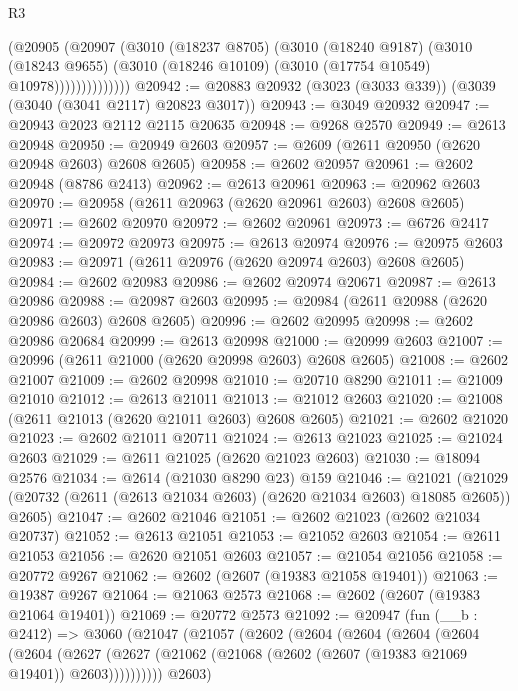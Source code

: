 \begin{lexlean}{R3}
\begin{coremodule}
                  (@20905
                    (@20907
                      (@3010
                        (@18237 @8705)
                        (@3010
                          (@18240 @9187)
                          (@3010
                            (@18243 @9655)
                            (@3010 (@18246 @10109) (@3010 (@17754 @10549) @10978))))))))))))))
@20942 := @20883 @20932 (@3023 (@3033 @339)) (@3039 (@3040 (@3041 @2117) @20823 @3017))
@20943 := @3049 @20932
@20947 := @20943 @2023 @2112 @2115 @20635
@20948 := @9268 @2570
@20949 := @2613 @20948
@20950 := @20949 @2603
@20957 := @2609 (@2611 @20950 (@2620 @20948 @2603) @2608 @2605)
@20958 := @2602 @20957
@20961 := @2602 @20948 (@8786 @2413)
@20962 := @2613 @20961
@20963 := @20962 @2603
@20970 := @20958 (@2611 @20963 (@2620 @20961 @2603) @2608 @2605)
@20971 := @2602 @20970
@20972 := @2602 @20961
@20973 := @6726 @2417
@20974 := @20972 @20973
@20975 := @2613 @20974
@20976 := @20975 @2603
@20983 := @20971 (@2611 @20976 (@2620 @20974 @2603) @2608 @2605)
@20984 := @2602 @20983
@20986 := @2602 @20974 @20671
@20987 := @2613 @20986
@20988 := @20987 @2603
@20995 := @20984 (@2611 @20988 (@2620 @20986 @2603) @2608 @2605)
@20996 := @2602 @20995
@20998 := @2602 @20986 @20684
@20999 := @2613 @20998
@21000 := @20999 @2603
@21007 := @20996 (@2611 @21000 (@2620 @20998 @2603) @2608 @2605)
@21008 := @2602 @21007
@21009 := @2602 @20998
@21010 := @20710 @8290
@21011 := @21009 @21010
@21012 := @2613 @21011
@21013 := @21012 @2603
@21020 := @21008 (@2611 @21013 (@2620 @21011 @2603) @2608 @2605)
@21021 := @2602 @21020
@21023 := @2602 @21011 @20711
@21024 := @2613 @21023
@21025 := @21024 @2603
@21029 := @2611 @21025 (@2620 @21023 @2603)
@21030 := @18094 @2576
@21034 := @2614 (@21030 @8290 @23) @159
@21046 := @21021
    (@21029 (@20732 (@2611 (@2613 @21034 @2603) (@2620 @21034 @2603) @18085 @2605)) @2605)
@21047 := @2602 @21046
@21051 := @2602 @21023 (@2602 @21034 @20737)
@21052 := @2613 @21051
@21053 := @21052 @2603
@21054 := @2611 @21053
@21056 := @2620 @21051 @2603
@21057 := @21054 @21056
@21058 := @20772 @9267
@21062 := @2602 (@2607 (@19383 @21058 @19401))
@21063 := @19387 @9267
@21064 := @21063 @2573
@21068 := @2602 (@2607 (@19383 @21064 @19401))
@21069 := @20772 @2573
@21092 := @20947
    (fun (__b : @2412) =>
    @3060
      (@21047
        (@21057
          (@2602
            (@2604
              (@2604
                (@2604
                  (@2604
                    (@2604
                      (@2627
                        (@2627 (@21062 (@21068 (@2602 (@2607 (@19383 @21069 @19401)) @2603))))))))))
            @2603)

\end{coremodule}
\end{lexlean}
